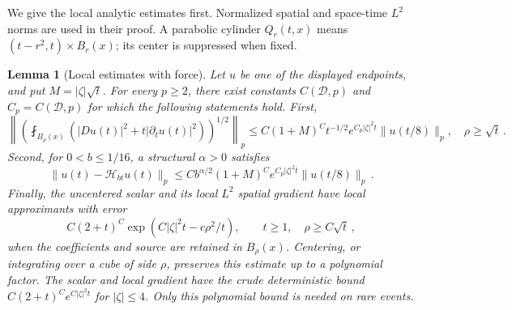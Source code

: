 \documentclass[11pt]{amsart}
\newtheorem{lemma}[proposition]{Lemma}
\theoremstyle{definition}
\theoremstyle{remark}
\numberwithin{equation}{section}
\begin{document}
We give the local analytic estimates first. Normalized spatial and space-time $L^2$ norms are used in their proof. A parabolic cylinder $Q_r(t,x)$ means $(t-r^2,t)\times B_r(x)$; its center is suppressed when fixed.

\begin{lemma}[Local estimates with force]\label{l:forced-local}
Let $u$ be one of the displayed endpoints, and put $M=|\zeta|\sqrt t$. For every $p\geq2$, there exist constants $C(\mathcal D,p)$ and $C_p=C(\mathcal D,p)$ for which the following statements hold. First,
\begin{equation}\label{e:local-time}
 \left\|\left(\fint_{B_\rho(x)}
       (|Du(t)|^2+t|\partial_tu(t)|^2)\right)^{1/2}\right\|_p
 \leq C(1+M)^C t^{-1/2}e^{C_p|\zeta|^2t}
             \|u(t/8)\|_p,
 \quad \rho\geq\sqrt t\, .
\end{equation}
Second, for $0<b\leq1/16$, a structural $\alpha>0$ satisfies
\begin{equation}\label{e:holder-average}
 \|u(t)-\mathcal H_{bt}u(t)\|_p
 \leq C b^{\alpha/2}(1+M)^C e^{C_p|\zeta|^2t}
             \|u(t/8)\|_p\, .
\end{equation}
Finally, the uncentered scalar and its local $L^2$ spatial gradient have local approximants with error
\begin{equation}\label{e:forced-locality}
 C(2+t)^C\exp(C|\zeta|^2t-c\rho^2/t),
 \qquad t\geq1,\quad \rho\geq C\sqrt t\, ,
\end{equation}
when the coefficients and source are retained in $B_\rho(x)$. Centering, or integrating over a cube of side $\rho$, preserves this estimate up to a polynomial factor. The scalar and local gradient have the crude deterministic bound $C(2+t)^C e^{C|\zeta|^2t}$ for $|\zeta|\leq4$. Only this polynomial bound is needed on rare events.
\end{lemma}
\end{document}
